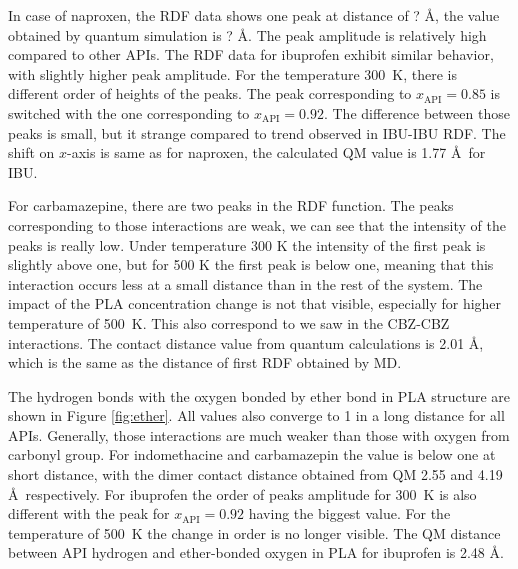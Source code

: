 In case of naproxen, the RDF data shows one peak at distance of ? \AA, the value obtained by quantum simulation is ? \AA. The peak amplitude is relatively high compared to other APIs. The RDF data for ibuprofen exhibit similar behavior, with slightly higher peak amplitude. For the temperature 300~K, there is different order of heights of the peaks. The peak corresponding to $x_\text{API}=0.85$ is switched with the one corresponding to $x_\text{API}=0.92$. The difference between those peaks is small, but it strange compared to trend observed in IBU-IBU RDF. The shift on $x$-axis is same as for naproxen, the calculated QM value is 1.77 \AA~for IBU.

For carbamazepine, there are two peaks in the RDF function. The peaks corresponding to those interactions are weak, we can see that the intensity of the peaks is really low. Under temperature 300 K the intensity of the first peak is slightly above one, but for 500 K the first peak is below one, meaning that this interaction occurs less at a small distance than in the rest of the system. The impact of the PLA concentration change is not that visible, especially for higher temperature of 500~K. This also correspond to we saw in the CBZ-CBZ interactions. The contact distance value from quantum calculations is 2.01 \AA, which is the same as the distance of first RDF obtained by MD.


The hydrogen bonds with the oxygen bonded by ether bond in PLA structure are shown in Figure \ref{fig:ether}. All values also converge to 1 in a long distance for all APIs. Generally, those interactions are much weaker than those with oxygen from carbonyl group. For indomethacine and carbamazepin the value is below one at short distance, with the dimer contact distance obtained from QM 2.55 and 4.19 \AA~respectively. For ibuprofen the order of peaks amplitude for 300~K is also different with the peak for $x_\text{API}=0.92$ having the biggest value. For the temperature of 500~K the change in order is no longer visible. The QM distance between API hydrogen and ether-bonded oxygen in PLA for ibuprofen is 2.48 \AA.


